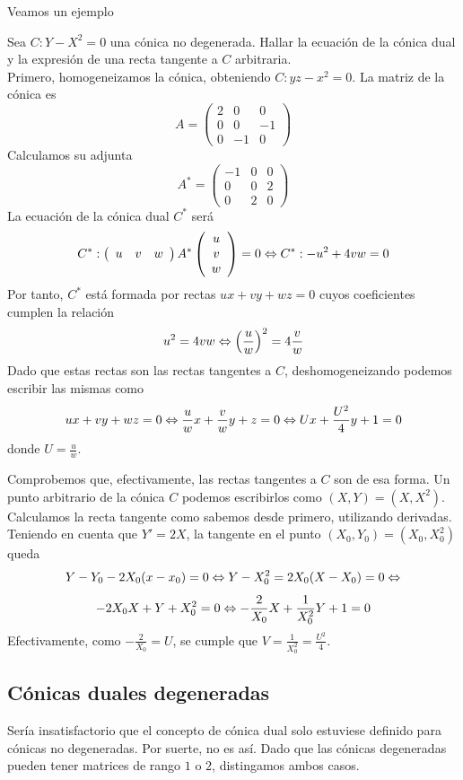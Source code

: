 Veamos un ejemplo
\begin{exa}
	Sea $C:Y-X^2=0$ una cónica no degenerada. Hallar la ecuación de la cónica dual y la expresión de una recta tangente a $C$ arbitraria.\\
	
	Primero, homogeneizamos la cónica, obteniendo $C:yz-x^2=0$. La matriz de la cónica es
	\[A=\left( \begin{array}{ccc}
		2&0&0\\
		0&0&-1\\
		0&-1&0
	\end{array}\right) \]
	Calculamos su adjunta
	\[A^*=\left( \begin{array}{ccc}
		 -1&0&0\\
		 0&0&2\\
		 0&2&0
	\end{array}\right) \]
	La ecuación de la cónica dual $C^*$ será 
	\[C^*:\left( \begin{array}{ccc}
	u&v&w
	\end{array}\right) A^*\left( \begin{array}{c}
	u\\v\\w
	\end{array}\right) =0\Leftrightarrow C^*:-u^2+4vw=0\]
	Por tanto, $C^*$ está formada por rectas $ux+vy+wz=0$ cuyos coeficientes cumplen la relación
	\[u^2=4vw\Leftrightarrow \left( \frac{u}{w}\right) ^2=4\frac{v}{w}\]
	Dado que estas rectas son las rectas tangentes a $C$, deshomogeneizando podemos escribir las mismas como
	\[ux+vy+wz=0\Leftrightarrow \frac{u}{w}x+\frac{v}{w}y+z=0\Leftrightarrow Ux+\frac{U^2}{4}y+1=0\]
	donde $U=\frac{u}{w}$. 
	
	Comprobemos que, efectivamente, las rectas tangentes a $C$ son de esa forma. Un punto arbitrario de la cónica $C$ podemos escribirlos como $(X,Y)=(X,X^2)$. Calculamos la recta tangente como sabemos desde primero, utilizando derivadas. Teniendo en cuenta que $Y'=2X$, la tangente en el punto $(X_0,Y_0)=(X_0,X_0^2)$ queda
	\[Y-Y_0-2X_0(x-x_0)=0\Leftrightarrow Y-X_0^2=2X_0(X-X_0)=0\Leftrightarrow\]
	\[-2X_0X+Y+X_0^2=0\Leftrightarrow -\frac{2}{X_0}X+\frac{1}{X_0^2}Y +1=0\]
	Efectivamente, como $-\frac{2}{X_0}=U$, se cumple que $V=\frac{1}{X_0^2}=\frac{U^2}{4}$.
\end{exa}
\subsection{Cónicas duales degeneradas}
Sería insatisfactorio que el concepto de cónica dual solo estuviese definido para cónicas no degeneradas. Por suerte, no es así. Dado que las cónicas degeneradas pueden tener matrices de rango $1$ o $2$, distingamos ambos casos.\\

